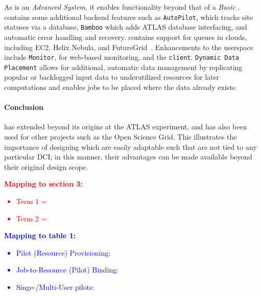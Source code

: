 \documentclass{sig-alternate}
\begin{document}
As \panda is an \textit{Advanced \pilotjob System}, it enables functionality
beyond that of a \textit{Basic \pilotjob}.
\panda contains some additional backend features such as \texttt{AutoPilot}, which
tracks site statuses via a database, \texttt{Bamboo} which adds
ATLAS database interfacing, and automatic error handling and recovery.
\panda contains support for queues in clouds, including EC2, Helix Nebula,
and FutureGrid~\cite{pandapresentation2013-06}.
Enhancements to the userspace include
\texttt{Monitor}, for web-based monitoring, and the \texttt{\panda client}.
\texttt{\panda Dynamic Data Placement} \cite{maeno_pd2p:_2012}
allows for additional, automatic data
management by replicating popular or backlogged input data to underutilized resources
for later computations and enables jobs to be placed where the data
already exists.


\paragraph{\panda Conclusion}
\panda has extended beyond its origins at the ATLAS experiment, and has also been used for other projects such
as the Open Science Grid.  This illustrates the importance of designing
\pilotjobs which are easily adaptable such that \pilots are not tied
to any particular DCI; in this manner, their advantages can be made
available beyond their original design scope.

\textcolor{red}
{
\textbf{Mapping to section 3:}
\begin{itemize}
\item Term 1 =
\item Term 2 =
\end{itemize}
}

\textcolor{blue}
{
\textbf{Mapping to table 1:}
\begin{itemize}
\item Pilot (Resource) Provisioning:
\item Job-to-Resource (Pilot) Binding:
\item Singe-/Multi-User pilots:
\end{itemize}
}



\end{document}
